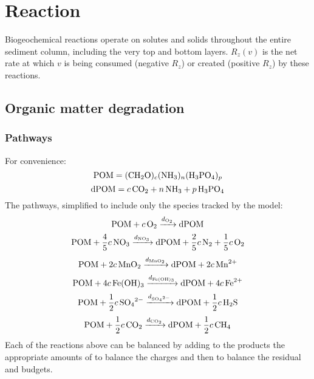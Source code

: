 \documentclass[a4paper]{article}
\begin{document}
\section{Reaction}\label{sx:reaction}

Biogeochemical reactions operate on solutes and solids throughout the entire sediment column, including the very top and bottom layers.  $R_z(v)$ is the net rate at which $v$ is being consumed (negative $R_z$) or created (positive $R_z$) by these reactions.


\subsection{Organic matter degradation}

\subsubsection{Pathways}

For convenience:
\begin{equation}
  \ce{POM} = \ce{(CH2O)$_c$(NH3)$_n$(H3PO4)$_p$}
\end{equation}
\begin{equation}
  \ce{dPOM} = \ce{$c$CO2 + $n$NH3 + $p$H3PO4}
\end{equation}
The pathways, simplified to include only the species tracked by the model:
\begin{equation}
  \ce{POM + $c$O2 ->[$d_{\ce{O2}}$] dPOM}%
\end{equation}
\begin{equation}
  \ce{POM + $\frac{4}{5}c\,$NO3 ->[$d_{\ce{NO3}}$] dPOM + $\frac{2}{5}c\,$N2 + $\frac{1}{5}c\,$O2}%
\end{equation}
\begin{equation}
  \ce{POM + $2c\,$MnO2 ->[$d_{\ce{MnO2}}$] dPOM + $2c\,$Mn^2+}%
\end{equation}
\begin{equation}
  \ce{POM + $4c\,$Fe(OH)3 ->[$d_{\ce{Fe(OH)3}}$] dPOM + $4c\,$Fe^2+}%
\end{equation}
\begin{equation}
  \ce{POM + $\frac{1}{2}c\,$SO4^2- ->[$d_{\ce{SO4^2-}}$] dPOM + $\frac{1}{2}c\,$H2S}%
\end{equation}
\begin{equation}
  \ce{POM + $\frac{1}{2}c\,$CO2 ->[$d_{\ce{CO2}}$] dPOM + $\frac{1}{2}c\,$CH4}
\end{equation}
Each of the reactions above can be balanced by adding to the products the appropriate amounts of  to balance the charges and then  to balance the residual  and  budgets.
\end{document}
